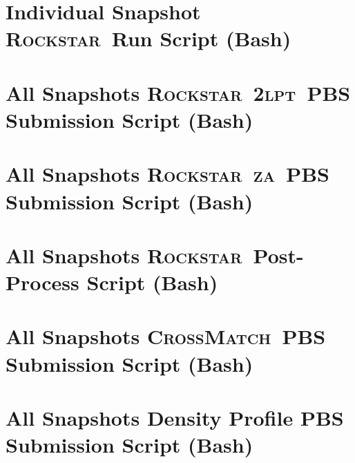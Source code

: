 \documentclass[12pt]{report}
\newcommand{\lpt}{\textsc{2lpt}}
\newcommand{\za}{\textsc{za}}
\newcommand{\rockstar}{\textsc{Rockstar}}
\newcommand{\crossmatch}{\textsc{CrossMatch}}
\begin{document}
\begin{appendices}
	\section{Individual Snapshot \rockstar\ Run Script (Bash)}
	\label{app:begin_run}
	
	\section{All Snapshots \rockstar\ \lpt\ PBS Submission Script (Bash)}
	\label{app:run_2lpt}
	
	\section{All Snapshots \rockstar\ \za\ PBS Submission Script (Bash)}
	\label{app:run_za}
	
	\section{All Snapshots \rockstar\ Post-Process Script (Bash)}
	\label{app:postprocess_all}
	
	\section{All Snapshots \crossmatch\ PBS Submission Script (Bash)}
	\label{app:run_crossmatch}
	
	\section{All Snapshots Density Profile PBS Submission Script (Bash)}
	\label{app:run_density_profile}
	

\end{appendices}
\end{document}
